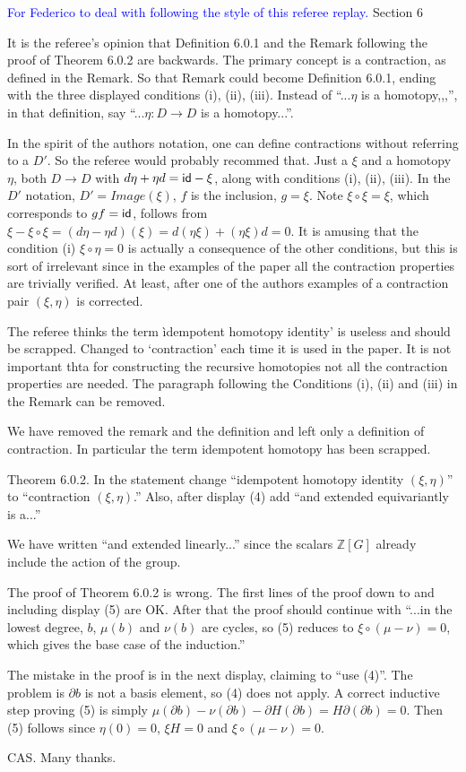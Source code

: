 \textcolor{blue}{For Federico to deal with following the style of this referee replay.} Section 6

\subitem It is the referee's opinion that Definition 6.0.1 and the Remark following the proof of Theorem 6.0.2 are backwards. The primary concept is a contraction, as defined in the Remark. So that Remark could become Definition 6.0.1, ending with the three displayed conditions (i), (ii), (iii). Instead of ``...$\eta$ is a homotopy,,,'', in that definition, say ``...$\eta\colon D\to D$ is a homotopy...''.

In the spirit of the authors notation, one can define contractions without referring to a $D'$. So the referee would probably recommed that. Just a $\xi$ and a homotopy $\eta$, both $D\to D$ with $d\eta+\eta d = \mathsf{id}-\xi$, along with conditions (i), (ii), (iii). In the $D'$ notation, $D' = Image(\xi)$, $f$ is the inclusion, $g = \xi$. Note $\xi\circ\xi = \xi$, which corresponds to $gf=\mathsf{id}$, follows from $\xi-\xi\circ\xi = (d\eta-\eta d)(\xi) = d(\eta\xi) + (\eta\xi)d = 0$. It is amusing that the condition (i) $\xi\circ\eta=0$ is actually a consequence of the other conditions, but this is sort of irrelevant since in the examples of the paper all the contraction properties are trivially verified. At least, after one of the authors examples of a contraction pair $(\xi,\eta)$ is corrected.

The referee thinks the term ìdempotent homotopy identity' is useless and should be scrapped. Changed to `contraction' each time it is used in the paper. It is not important thta for constructing the recursive homotopies not all the contraction properties are needed. The paragraph following the Conditions (i), (ii) and (iii) in the Remark can be removed. 

\ar We have removed the remark and the definition and left only a definition of contraction. In particular the term idempotent homotopy has been scrapped.

\subitem Theorem 6.0.2. In the statement change ``idempotent homotopy identity $(\xi,\eta)$'' to ``contraction $(\xi,\eta)$.'' Also, after display (4) add ``and extended equivariantly is a...''

\ar We have written ``and extended linearly...'' since the scalars $\mathbb{Z}[G]$ already include the action of the group.

\subitem The proof of Theorem 6.0.2 is wrong. The first lines of the proof down to and including display (5) are OK. After that the proof should continue with ``...in the lowest degree, $b$, $\mu(b)$ and $\nu(b)$ are cycles, so (5) reduces to $\xi\circ (\mu-\nu) = 0$, which gives the base case of the induction.''

The mistake in the proof is in the next display, claiming to ``use (4)''. The problem is $\partial b$ is not a basis element, so (4) does not apply. A correct inductive step proving (5) is simply 
$\mu(\partial b) - \nu(\partial b) - \partial H(\partial b) = H\partial(\partial b) = 0.$ Then (5) follows since $\eta(0) = 0$, $\xi H=0$ and $\xi\circ (\mu-\nu) = 0$.

\ar CAS. Many thanks.

